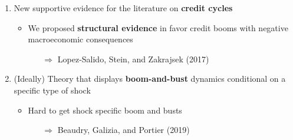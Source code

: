 \documentclass[hyperref={pdfpagelabels=false}]{beamer}
\begin{document}
{\begin{enumerate}
	
	\item New supportive evidence for the literature on \textbf{credit cycles}
	\begin{itemize}
		\item \footnotesize{We proposed \textbf{structural evidence} in favor credit booms with negative macroeconomic consequences}
		\begin{itemize}
			\item[$\Rightarrow$] Lopez-Salido, Stein, and Zakrajsek (2017) 
		\end{itemize}
		\end{itemize}
	

	
	\bigskip
	
	\item (Ideally) Theory that displays \textbf{boom-and-bust} dynamics conditional on a specific type of shock
	\begin{itemize}
		\item Hard to get shock specific boom and busts
		\begin{itemize}
			\item[$\Rightarrow$] Beaudry, Galizia, and Portier (2019)
		\end{itemize} 
		\end{itemize}
	
	    
\end{enumerate}	
		
}





\end{document}
